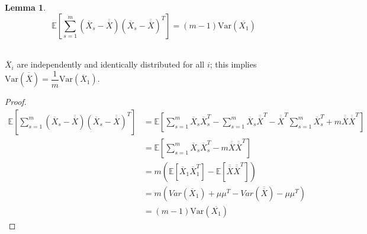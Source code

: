 \documentclass[12pt]{article}
\newcommand{\Var}{\text{Var}}
\newtheorem{lemma}{Lemma}
\begin{document}
\begin{lemma} \label{lemma:bias2}
$$\mathbb{E}\left[\sum\limits_{s=1}^{m}(\overline{X}_{s}-\overline{\overline{X}})(\overline{X}_{s}-\overline{\overline{X}})^{T}\right] =  (m-1)\Var(\overline{X_1})$$
\end{lemma}
\\
$\overline{X}_i$ are independently and identically distributed for all $i$; this implies $\Var(\overline{\overline{X}}) = \dfrac{1}{m} \Var(\overline{X}_1)$. 

\begin{proof}
\begin{align*}
\mathbb{E}\left[\sum\limits_{s=1}^{m}(\overline{X}_{s}-\overline{\overline{X}})(\overline{X}_{s}-\overline{\overline{X}})^{T}\right] &= \mathbb{E}\left[\sum_{s=1}^{m}\overline{X}_{s}\overline{X}_{s}^{T} -\sum_{s=1}^{m}\overline{X}_{s}\overline{\overline{X}}^{T} - \overline{\overline{X}}^{T}\sum_{s=1}^{m}\overline{X}_{s}^{T} + m\overline{\overline{X}}\overline{\overline{X}}^{T}\right]\\
&= \mathbb{E}\left[\sum_{s=1}^{m}\overline{X}_{s}\overline{X}_{s}^{T} - m\overline{\overline{X}}\overline{\overline{X}}^{T}\right]\\
&= m\left(\mathbb{E}\left[\overline{X}_{1}\overline{X}_{1}^{T}\right] - \mathbb{E}\left[\overline{\overline{X}}\overline{\overline{X}}^{T}\right]\right)\\
&= m\left(Var(\overline{X}_{1}) + \mu\mu^{T} - Var(\overline{\overline{X}}) - \mu\mu^{T}\right)\\
&= (m-1)\Var(\overline{X_1})
\end{align*}
\end{proof}
\end{document}

